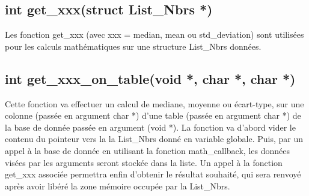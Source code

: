 \subsection{int get\_xxx(struct List\_Nbrs *)}
Les fonction get\_xxx (avec xxx = median, mean ou std\_deviation) sont utilisées pour les calculs mathématiques sur une structure List\_Nbrs données.
\subsection{int get\_xxx\_on\_table(void *, char *, char *)}
Cette fonction va effectuer un calcul de mediane, moyenne ou écart-type, sur une colonne (passée en argument char *) d'une table (passée en argument char *) de la base de donnée passée en argument (void *). La fonction va d'abord vider le contenu du pointeur vers la la List\_Nbrs donné en variable globale. Puis, par un appel à la base de donnée en utilisant la fonction math\_callback, les données visées par les arguments seront stockée dans la liste. Un appel à la fonction get\_xxx associée permettra enfin d'obtenir le résultat souhaité, qui sera renvoyé après avoir libéré la zone mémoire occupée par la List\_Nbrs.

